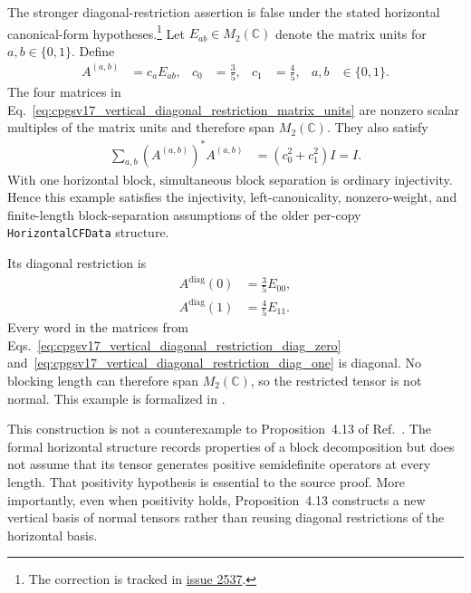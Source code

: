 \documentclass{article}
\begin{document}
The stronger diagonal-restriction assertion is false under the stated
horizontal canonical-form hypotheses.\footnote{The correction is tracked in
    \href{https://github.com/LionSR/TNLean/issues/2537}{issue 2537}.}
Let $E_{ab}\in M_2(\mathbb C)$ denote the matrix units for
$a,b\in\{0,1\}$. Define
\begin{align}
    A^{(a,b)}
        & =c_aE_{ab},
        &
    c_0 & =\frac{3}{5},
        &
    c_1 & =\frac{4}{5},
        &
    a,b & \in\{0,1\}.
    \label{eq:cpgsv17_vertical_diagonal_restriction_matrix_units}
\end{align}
The four matrices in
Eq.~\ref{eq:cpgsv17_vertical_diagonal_restriction_matrix_units} are nonzero
scalar multiples of the matrix units and therefore span $M_2(\mathbb C)$.
They also satisfy
\begin{align}
    \sum_{a,b}
    (A^{(a,b)})^*A^{(a,b)}
     & =
    (c_0^2+c_1^2)I
    =I.
    \label{eq:cpgsv17_vertical_diagonal_restriction_left_canonical}
\end{align}
With one horizontal block, simultaneous block separation is ordinary
injectivity. Hence this example satisfies the injectivity, left-canonicality,
nonzero-weight, and finite-length block-separation assumptions of the older
per-copy \texttt{HorizontalCFData} structure.

Its diagonal restriction is
\begin{align}
    A^{\mathrm{diag}}(0)
     & =\frac{3}{5}E_{00},
    \label{eq:cpgsv17_vertical_diagonal_restriction_diag_zero} \\
    A^{\mathrm{diag}}(1)
     & =\frac{4}{5}E_{11}.
    \label{eq:cpgsv17_vertical_diagonal_restriction_diag_one}
\end{align}
Every word in the matrices from
Eqs.~\ref{eq:cpgsv17_vertical_diagonal_restriction_diag_zero}
and~\ref{eq:cpgsv17_vertical_diagonal_restriction_diag_one} is diagonal.
No blocking length can therefore span $M_2(\mathbb C)$, so the restricted
tensor is not normal. This example is formalized in
.

This construction is not a counterexample to Proposition~4.13 of
Ref.~\cite{Cirac2016MPDO_arXiv}. The formal horizontal structure records
properties of a block decomposition but does not assume that its tensor
generates positive semidefinite operators at every length. That positivity
hypothesis is essential to the source proof. More importantly, even when
positivity holds, Proposition~4.13 constructs a new vertical basis of normal
tensors rather than reusing diagonal restrictions of the horizontal basis.
\end{document}

